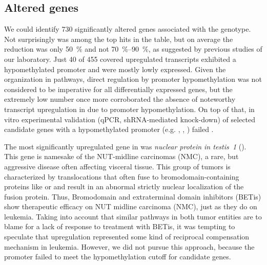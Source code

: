 \subsection{Altered genes}
\label{chap:r:degenes:genotypecontrast:genes}\label{chap:r:degenes:promhyposingle}

We could identify \num{730} significantly altered genes associated with the \dnmtchip genotype. Not surprisingly  was among the top hits in the table, but on average the reduction was only \SI{50}{\percent} and not \SIrange{70}{90}{\percent}, as suggested by previous studies of our laboratory\cite{Vockentanz2011}. Just \num{40} of \num{455} covered upregulated transcripts exhibited a hypomethylated promoter and were mostly lowly expressed. Given the organization in pathways, direct regulation by promoter hypomethylation was not considered to be imperative for all differentially expressed genes, but the extremely low number once more corroborated the absence of noteworthy transcript upregulation in \dnmtchip due to promoter hypomethylation. On top of that,  in vitro experimental validation (qPCR, shRNA-mediated knock-down) of selected candidate genes with a hypomethylated promoter (e.g. , , ) failed \dns. 

The most significantly upregulated gene in \dnmtchip was \emph{nuclear protein in testis~1} (). This gene is namesake of the NUT-midline carcinomas (NMC), a rare, but aggressive disease often affecting visceral tissue. This group of tumors is characterized by translocations that often fuse  to bromodomain-containing proteins like  or  and result in an abnormal strictly nuclear localization of the fusion protein\cite{French2008,Thompson-Wicking2013}. Thus, Bromodomain and extraterminal domain inhibitors (BETis) show therapeutic efficacy on NUT midline carcinoma (NMC), just as they do on \mllafnine leukemia\cite{Dawson2011,Roe2015}. Taking into account that similar pathways in both tumor entities are to blame for a lack of response to treatment with BETis\cite{Fong2015, Liao2018}, it was tempting to speculate that  upregulation represented some kind of reciprocal compensation mechanism in \dnmtchip \mllafnine leukemia. However, we did not pursue this approach, because the promoter failed to meet the hypomethylation cutoff for candidate genes. 

